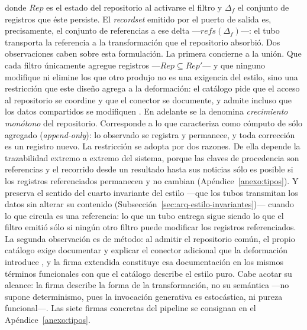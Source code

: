 \documentclass[12pt]{report}
\begin{document}
donde \(\mathit{Rep}\) es el estado del repositorio al activarse el filtro y \(\Delta_f\) el conjunto de registros que éste persiste. El \textit{recordset} emitido por el puerto de salida es, precisamente, el conjunto de referencias a ese delta ---\(\mathit{refs}(\Delta_f)\)---: el tubo transporta la referencia a la transformación que el repositorio absorbió. Dos observaciones caben sobre esta formulación. La primera concierne a la unión. Que cada filtro únicamente agregue registros ---\(\mathit{Rep} \subseteq \mathit{Rep}'\)--- y que ninguno modifique ni elimine los que otro produjo no es una exigencia del estilo, sino una restricción que este diseño agrega a la deformación: el catálogo pide que el acceso al repositorio se coordine y que el conector se documente, y admite incluso que los datos compartidos se modifiquen \citep[\S3.13.1]{cristia:2025}. En adelante se la denomina \textit{crecimiento monótono} del repositorio. Corresponde a lo que \citet{helland:2015} caracteriza como cómputo de sólo agregado (\textit{append-only}): lo observado se registra y permanece, y toda corrección es un registro nuevo. La restricción se adopta por dos razones. De ella depende la trazabilidad extremo a extremo del sistema, porque las claves de procedencia son referencias y el recorrido desde un resultado hasta sus noticias sólo es posible si los registros referenciados permanecen y no cambian (Apéndice~\ref{anexo:tipos}). Y preserva el sentido del cuarto invariante del estilo ---que los tubos transmitan los datos sin alterar su contenido (Subsección~\ref{sec:arq-estilo-invariantes})--- cuando lo que circula es una referencia: lo que un tubo entrega sigue siendo lo que el filtro emitió sólo si ningún otro filtro puede modificar los registros referenciados. La segunda observación es de método: al admitir el repositorio común, el propio catálogo exige documentar y explicar el conector adicional que la deformación introduce \citep[\S3.13.1]{cristia:2025}, y la firma extendida constituye esa documentación en los mismos términos funcionales con que el catálogo describe el estilo puro. Cabe acotar su alcance: la firma describe la forma de la transformación, no su semántica ---no supone determinismo, pues la invocación generativa es estocástica, ni pureza funcional---. Las siete firmas concretas del pipeline se consignan en el Apéndice~\ref{anexo:tipos}.
\end{document}
